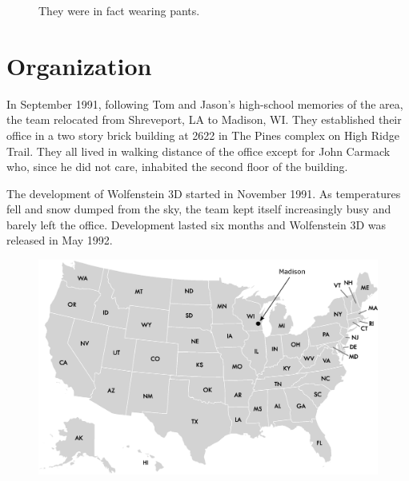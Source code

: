 \documentclass[book.tex]{subfiles}
\begin{document}
\begin{figure}[H]
\centering
  
    
\caption{They were in fact wearing pants.}
\label{fig:id_team_1993}
\end{figure}

\section{Organization}

In September 1991, following Tom and Jason's high-school memories of the area, the team relocated from Shreveport, LA to Madison, WI. They established their office in a two story brick building at 2622 in The Pines complex on High Ridge Trail. They all lived in walking distance of the office except for John Carmack who, since he did not care, inhabited the second floor of the building.\\
\par
The development of Wolfenstein 3D started in November 1991. As temperatures fell and snow dumped from the sky, the team kept itself increasingly busy and barely left the office. Development lasted six months and Wolfenstein 3D was released in May 1992.\\




\begin{figure}[H]
\centering
 \includegraphics[width=\textwidth]{imgs/drawings/map/usa-id-software.eps}
 \end{figure}


\par
\end{document}
